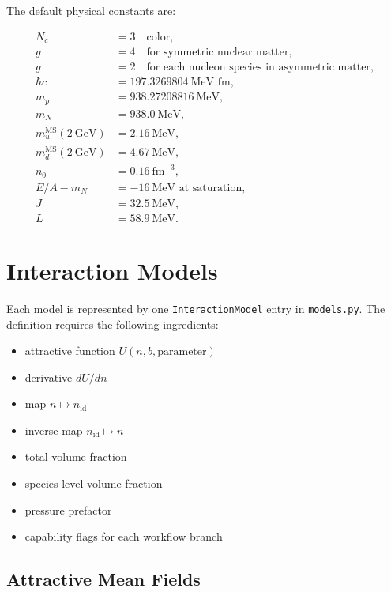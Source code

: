 \documentclass[11pt]{article}
\begin{document}
The default physical constants are:

\begin{align}
N_c &= 3  \quad \text{color}, \\
g &= 4 \quad \text{for symmetric nuclear matter}, \\
g &= 2 \quad \text{for each nucleon species in asymmetric matter}, \\
\hbar c &= 197.3269804~\text{MeV fm}, \\
m_p &= 938.27208816~\text{MeV}, \\
m_N &= 938.0~\text{MeV}, \\
m_u^{\overline{\mathrm{MS}}}(2~\text{GeV}) &= 2.16~\text{MeV}, \\
m_d^{\overline{\mathrm{MS}}}(2~\text{GeV}) &= 4.67~\text{MeV}, \\
n_0 &= 0.16~\text{fm}^{-3}, \\
E/A - m_N &= -16~\text{MeV at saturation}, \\
J &= 32.5~\text{MeV}, \\
L &= 58.9~\text{MeV}.
\end{align}


\section{Interaction Models}

Each model is represented by one \texttt{InteractionModel} entry in
\texttt{models.py}.  The definition requires the following ingredients:

\begin{itemize}
\item attractive function $U(n,b,\mathrm{parameter})$
\item derivative $dU/dn$
\item map $n \mapsto n_{\mathrm{id}}$
\item inverse map $n_{\mathrm{id}} \mapsto n$
\item total volume fraction
\item species-level volume fraction
\item pressure prefactor
\item capability flags for each workflow branch
\end{itemize}

\subsection{Attractive Mean Fields}
\end{document}
